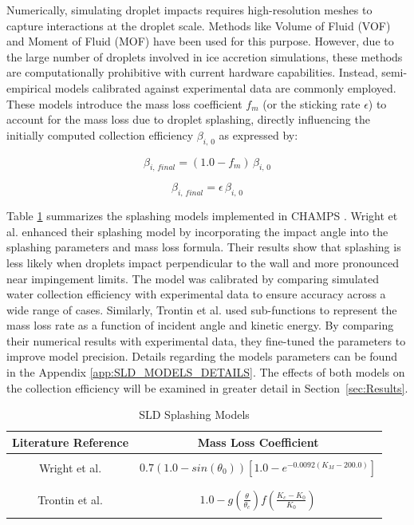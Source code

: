 Numerically, simulating droplet impacts requires high-resolution meshes to capture interactions at the droplet scale. Methods like Volume of Fluid (VOF) \cite{hirt1981volume} and Moment of Fluid (MOF) \cite{lian2014numerical} have been used for this purpose. However, due to the large number of droplets involved in ice accretion simulations, these methods are computationally prohibitive with current hardware capabilities. Instead, semi-empirical models calibrated against experimental data are commonly employed. These models introduce the mass loss coefficient $f_m$ (or the sticking rate $\epsilon$) to account for the mass loss due to droplet splashing, directly influencing the initially computed collection efficiency $\beta_{i, \, 0}$ as expressed by:  

\begin{equation}
    \beta_{i, \, final} = (1.0 - f_m) \, \beta_{i, \, 0} 
\end{equation}

\begin{equation}
    \beta_{i, \, final} = \epsilon \, \beta_{i, \, 0} 
\end{equation}

\noindent Table \ref{tab:splashing_Models} summarizes the splashing models implemented in CHAMPS \cite{laroche2021development}. Wright et al. \cite{wright2004semi} enhanced their splashing model by incorporating the impact angle into the splashing parameters and mass loss formula. Their results show that splashing is less likely when droplets impact perpendicular to the wall and more pronounced near impingement limits. The model was calibrated by comparing simulated water collection efficiency with experimental data to ensure accuracy across a wide range of cases. Similarly, Trontin et al. \cite{trontin2016revisited} used sub-functions to represent the mass loss rate as a function of incident angle and kinetic energy. By comparing their numerical results with experimental data, they fine-tuned the parameters to improve model precision. Details regarding the models parameters can be found in the Appendix \ref{app:SLD_MODELS_DETAILS}. The effects of both models on the collection efficiency will be examined in greater detail in Section~\ref{sec:Results}.

\begin{table}[htb!]
\centering
\caption{SLD Splashing Models}
\label{tab:splashing_Models}
\begin{tabular}{cc}
\hline
\hline
Literature Reference &
Mass Loss Coefficient \\ \hline\hline
\\
Wright et al. \cite{wright2004semi} &
$0.7 (1.0 - sin(\theta_0)) [1.0-e^{-0.0092(K_M - 200.0)}]$ \\ \\

\\
Trontin et al. \cite{trontin2016revisited} &
$ 1.0 - g(\frac{\theta}{\theta_c})f(\frac{K_c-K_0}{K_0})$\\ \\
\hline
\hline
\end{tabular}
\end{table}

